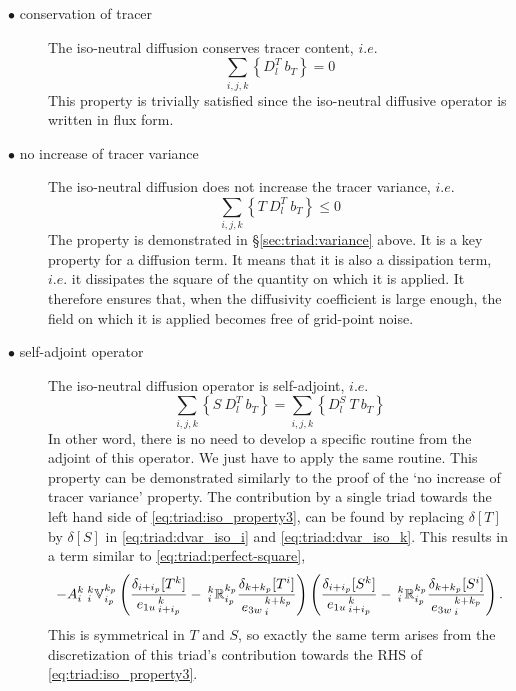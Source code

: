 \begin{description}
\item[$\bullet$ conservation of tracer] The iso-neutral diffusion
  conserves tracer content, $i.e.$
  \begin{equation} \label{eq:triad:iso_property1} \sum_{i,j,k} \left\{ D_l^T \
      b_T \right\} = 0
  \end{equation}
  This property is trivially satisfied since the iso-neutral diffusive
  operator is written in flux form.

\item[$\bullet$ no increase of tracer variance] The iso-neutral diffusion
  does not increase the tracer variance, $i.e.$
  \begin{equation} \label{eq:triad:iso_property2} \sum_{i,j,k} \left\{ T \ D_l^T
      \ b_T \right\} \leq 0
  \end{equation}
  The property is demonstrated in
  \S\ref{sec:triad:variance} above. It is a key property for a diffusion
  term. It means that it is also a dissipation term, $i.e.$ it
  dissipates the square of the quantity on which it is applied.  It
  therefore ensures that, when the diffusivity coefficient is large
  enough, the field on which it is applied becomes free of grid-point
  noise.

\item[$\bullet$ self-adjoint operator] The iso-neutral diffusion
  operator is self-adjoint, $i.e.$
  \begin{equation} \label{eq:triad:iso_property3} \sum_{i,j,k} \left\{ S \ D_l^T
      \ b_T \right\} = \sum_{i,j,k} \left\{ D_l^S \ T \ b_T \right\}
  \end{equation}
  In other word, there is no need to develop a specific routine from
  the adjoint of this operator. We just have to apply the same
  routine. This property can be demonstrated similarly to the proof of
  the `no increase of tracer variance' property. The contribution by a
  single triad towards the left hand side of \eqref{eq:triad:iso_property3}, can
  be found by replacing $\delta[T]$ by $\delta[S]$ in \eqref{eq:triad:dvar_iso_i}
  and \eqref{eq:triad:dvar_iso_k}. This results in a term similar to
  \eqref{eq:triad:perfect-square},
\begin{equation}
  \label{eq:triad:TScovar}
  - {A}_i^k{\:} _i^k\mathbb{V}_{i_p}^{k_p}
  \left(
    \frac{ \delta_{i+ i_p}[T^k] }{ {e_{1u}}_{\,i + i_p}^{\,k} }
    -{\:}_i^k\mathbb{R}_{i_p}^{k_p}
    \frac{ \delta_{k+k_p} [T^i] }{{e_{3w}}_{\,i}^{\,k+k_p} }
  \right)
  \left(
    \frac{ \delta_{i+ i_p}[S^k] }{ {e_{1u}}_{\,i + i_p}^{\,k} }
    -{\:}_i^k\mathbb{R}_{i_p}^{k_p}
    \frac{ \delta_{k+k_p} [S^i] }{{e_{3w}}_{\,i}^{\,k+k_p} }
  \right).
\end{equation}
This is symmetrical in $T $ and $S$, so exactly the same term arises
from the discretization of this triad's contribution towards the
RHS of \eqref{eq:triad:iso_property3}.
\end{description}
